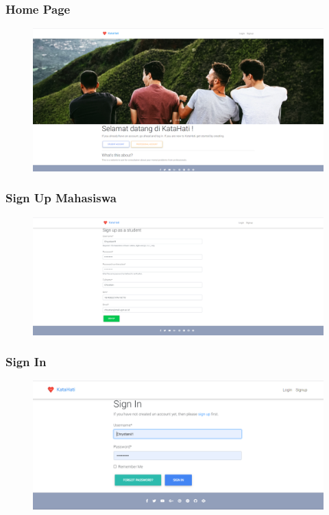 \documentclass{article}
\begin{document}
	\subsubsection{Home Page}
	\begin{figure}[H]
		\centering
		\includegraphics[width=480px]{Home Page.png}
	\end{figure}

	\subsubsection{Sign Up Mahasiswa}
	\begin{figure}[H]
		\centering
		\includegraphics[width=480px]{Sign Up Mahasiswa.png}
	\end{figure}

	\subsubsection{Sign In}
	\begin{figure}[H]
		\centering
		\includegraphics[width=480px]{Sign In.png}
	\end{figure}
\end{document}
